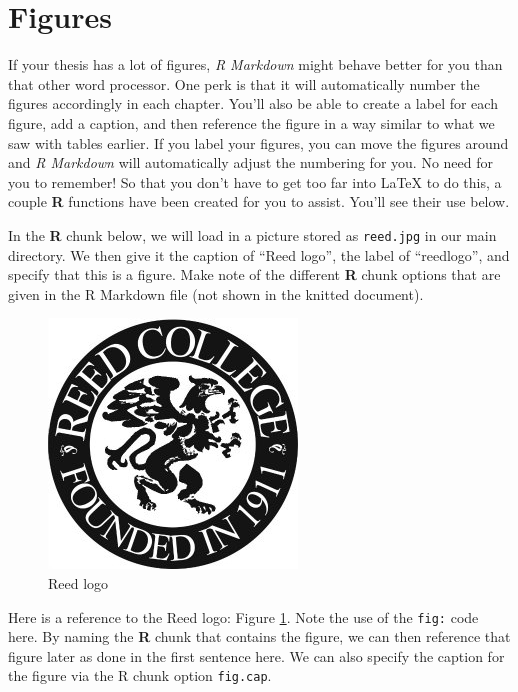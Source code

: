 \documentclass[12pt,twoside]{reedthesis}
\begin{document}
\hypertarget{figures}{%
\section{Figures}\label{figures}}

If your thesis has a lot of figures, \emph{R Markdown} might behave better for you than that other word processor. One perk is that it will automatically number the figures accordingly in each chapter. You'll also be able to create a label for each figure, add a caption, and then reference the figure in a way similar to what we saw with tables earlier. If you label your figures, you can move the figures around and \emph{R Markdown} will automatically adjust the numbering for you. No need for you to remember! So that you don't have to get too far into LaTeX to do this, a couple \textbf{R} functions have been created for you to assist. You'll see their use below.

In the \textbf{R} chunk below, we will load in a picture stored as \texttt{reed.jpg} in our main directory. We then give it the caption of ``Reed logo'', the label of ``reedlogo'', and specify that this is a figure. Make note of the different \textbf{R} chunk options that are given in the R Markdown file (not shown in the knitted document).
\begin{figure}

{\centering \includegraphics[width=0.2\linewidth]{figure/reed} 

}

\caption{Reed logo}\label{fig:reedlogo}
\end{figure}
Here is a reference to the Reed logo: Figure \ref{fig:reedlogo}. Note the use of the \texttt{fig:} code here. By naming the \textbf{R} chunk that contains the figure, we can then reference that figure later as done in the first sentence here. We can also specify the caption for the figure via the R chunk option \texttt{fig.cap}.

\clearpage
\end{document}
